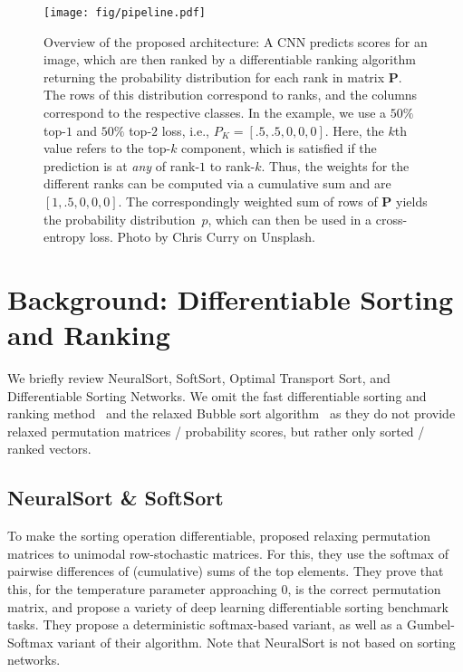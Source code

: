 \documentclass{article}
\def\mP{{\bm{P}}}
\newcommand{\revA}[1]{{#1}}
\newcommand{\revD}[1]{{#1}}
\begin{document}
\begin{figure*}[h]
    \centering
    \texttt{[image: fig/pipeline.pdf]}
    \caption{
        Overview of the proposed architecture:
        A CNN predicts scores for an image, which are then ranked by a differentiable ranking algorithm returning the probability distribution for each rank in matrix $\mP$.
        The rows of this distribution correspond to ranks, and the columns correspond to the respective classes.
        In the example, we use a $50\%$ top-$1$ and $50\%$ top-$2$ loss\revA{, i.e., $P_K=[.5, .5, 0, 0, 0]$. Here, the $k$th value refers to the top-$k$ component, which is satisfied if the prediction is at \textit{any} of \hbox{rank-$1$} to rank-$k$.
        Thus, the weights for the different ranks can be computed via a cumulative sum and are $[1, .5, 0, 0, 0]$.}
        The correspondingly weighted sum of rows of $\mP$ yields the probability distribution~$p$, which can then be used in a cross-entropy loss.  
        Photo by Chris Curry on Unsplash.
    }
    \label{fig:panda-overview}
\end{figure*}

\section[Background: Differentiable Sorting and Ranking]{Background: Differentiable Sorting and Ranking}

\label{sec:background-diff-sort-and-rank}

We briefly review NeuralSort, SoftSort, Optimal Transport Sort, and Differentiable Sorting Networks.
We omit the fast differentiable sorting and ranking method~\citep{Blondel2020-FastSorting} and the relaxed Bubble sort algorithm~\cite{petersen2021learning} as they do not provide relaxed permutation matrices / probability scores, but rather only sorted / ranked vectors.

\subsection{NeuralSort \& SoftSort}
\vspace*{-.25em}
To make the sorting operation differentiable, \citet{Grover2019-NeuralSort} proposed relaxing permutation matrices to unimodal row-stochastic matrices. 
For this, they use the softmax of pairwise differences of (cumulative) sums of the top elements.
They prove that this, for the temperature parameter approaching $0$, is the correct permutation matrix, and propose a variety of deep learning differentiable sorting benchmark tasks.
They propose a deterministic softmax-based variant, as well as a Gumbel-Softmax variant of their algorithm. 
\revD{Note that NeuralSort is not based on sorting networks.}
\end{document}
